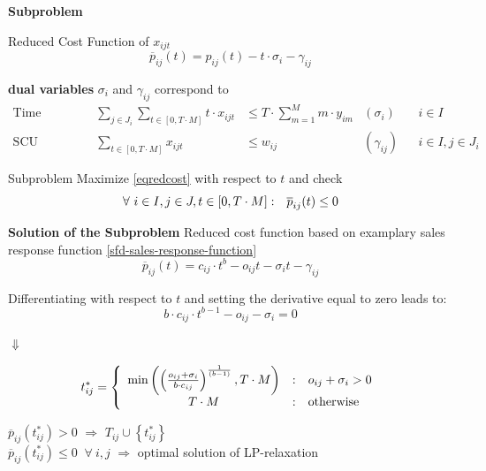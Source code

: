 \begin{frame}{\textbf{Subproblem}}
\begin{block}{Reduced Cost Function of $x_{ijt}$}
\begin{equation}\label{eqredcost}
\overline{p}_{ij}(t) =  p_{ij}(t) -  t \cdot \sigma_i  - \gamma_{ij}
\end{equation}
\end{block}
\textbf{dual variables} $\sigma_{i}$ and $\gamma_{ij}$ correspond to
\begin{align*}
\text{Time Allocation} &&   \sum_{ j \in J_i} \sum_{t\in [0,T \cdot M]} t \cdot x_{ijt}  & \leq T \cdot \sum_{m = 1}^M m \cdot y_{im}   & \left(\sigma_{i}\right)&& i \in I \\
\text{SCU Assignment} &&   \sum_{t \in \left[0,T \cdot M \right]}x_{ijt} & \leq w_{ij}  & \left(\gamma_{ij}\right)&& i \in I, j \in J_i 
\end{align*}
\vspace{-0.3cm}

\begin{block}{Subproblem}
Maximize \eqref{eqredcost} with respect to $t$ and check 
\begin{equation} \label{sfd-pricing}
\forall \ i \in I, j \in J, t \in [0,T \cdot M]: \hspace{0.25cm} 
\overline{p}_{ij}(t) \le 0  
\end{equation}
\end{block}
\end{frame}

\begin{frame}{\textbf{Solution of the Subproblem}}
Reduced cost function based on examplary sales response function \eqref{sfd-sales-response-function}
\[
  \overline{p}_{ij}(t) =   c_{ij} \cdot t^b - o_{ij} t  - \sigma_i t - \gamma_{ij}  
\]

\noindent Differentiating with respect to $t$ and setting the derivative equal to zero leads to: 
\begin{equation}
              b \cdot c_{ij} \cdot t^{b-1} - o_{ij} - \sigma_i = 0 
\end{equation}


\centerline{$\Downarrow$} 
\begin{equation} 
  t_{ij}^* = \left\{ \begin{array}{c@{\quad:\quad}l}
          \min \left(  \left({\frac{ o_{ij} + \sigma_i } { b \cdot
          c_{ij}}}\right)^{ \frac{1}{(b-1)}},T \cdot M \right)
                     & 
                   o_{ij} +  \sigma_i > 0\\
              T \cdot M &  \mbox{otherwise}
 \end{array} \right.
\end{equation} 



 $ \overline{p}_{ij} (t_{ij}^*) > 0$ $\Rightarrow$ $T_{ij} \cup \left\{t_{ij}^*\right\}$\\[1.5ex]
 $ \overline{p}_{ij} (t_{ij}^*) \le 0 \; \;\forall \ i,j$ $\Rightarrow$ optimal solution of LP-relaxation

\end{frame}


